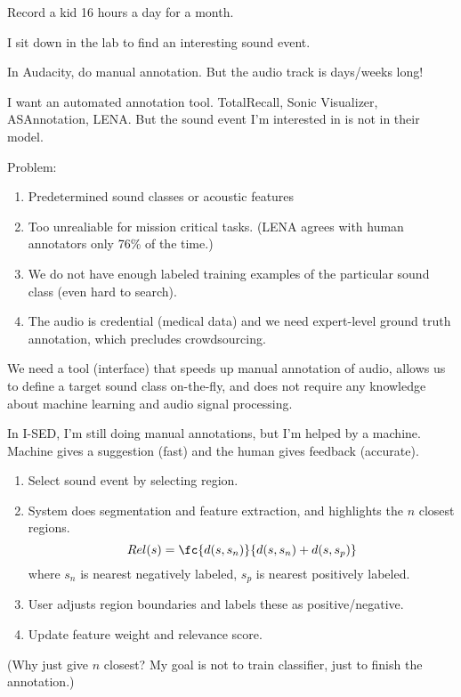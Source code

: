
Record a kid 16 hours a day for a month. 

I sit down in the lab to find an interesting sound event.

In Audacity, do manual annotation.
But the audio track is days/weeks long!

I want an automated annotation tool. TotalRecall, Sonic Visualizer, ASAnnotation, LENA. But the sound event I'm interested in is not in their model.

Problem:
\begin{enumerate}
\item
Predetermined sound classes or acoustic features
\item
Too unrealiable for mission critical tasks. (LENA agrees with human annotators only 76\% of the time.)
\item
We do not have enough labeled training examples of the particular sound class (even hard to search). 
\item
The audio is credential (medical data) and we need expert-level ground truth annotation, which precludes crowdsourcing.
\end{enumerate}

We need a tool (interface) that speeds up manual annotation of audio, allows us to define a target sound class on-the-fly, and does not require any knowledge about machine learning and audio signal processing.

In I-SED, I'm still doing manual annotations, but I'm helped by a machine. Machine gives a suggestion (fast) and the human gives feedback (accurate). 

\begin{enumerate}
\item
Select sound event by selecting region.
\item
System does segmentation and feature extraction, and highlights the $n$ closest regions. 
$$
Rel(s) = \fc{d(s,s_n)}{d(s,s_n)+d(s,s_p)}
$$
where $s_n$ is nearest negatively labeled, $s_p$ is nearest positively labeled.
\item
User adjusts region boundaries and labels these as positive/negative. 
\item
Update feature weight and relevance score.
\end{enumerate}

(Why just give $n$ closest? My goal is not to train classifier, just to finish the annotation.)

